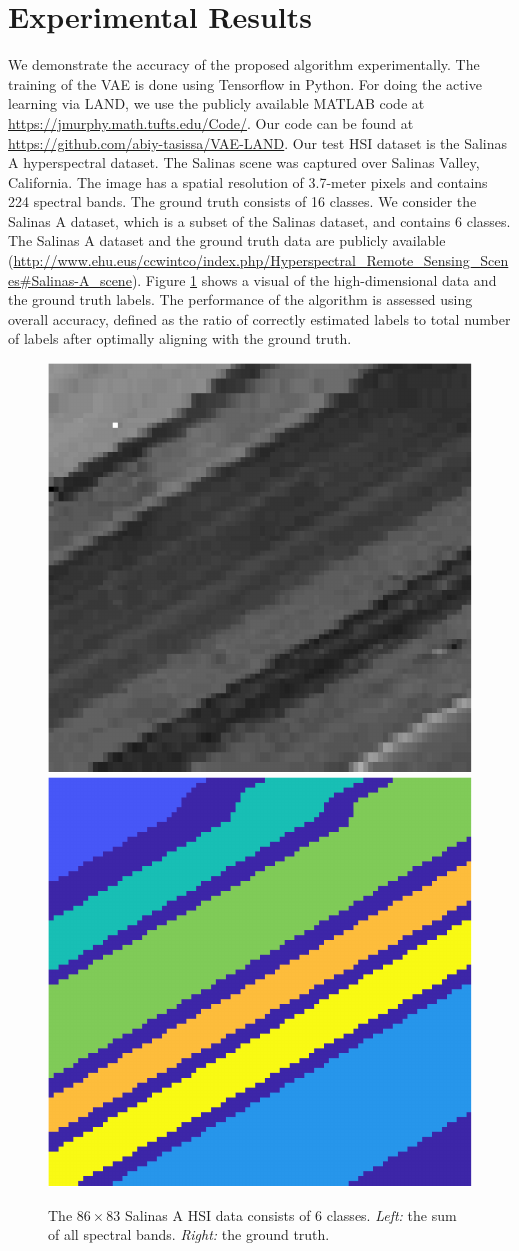 \documentclass{article}
\begin{document}
\section{Experimental Results}
\label{sec:Experiments}
We demonstrate the accuracy of the proposed algorithm experimentally.  The training of the VAE is done using Tensorflow in Python. For doing the active learning via LAND, we use the publicly available MATLAB code 
at  \url{https://jmurphy.math.tufts.edu/Code/}. Our code can be found at \url{https://github.com/abiy-tasissa/VAE-LAND}. Our test HSI dataset is the Salinas A hyperspectral dataset. The Salinas scene was captured over Salinas Valley, California. The image has a spatial resolution of 3.7-meter pixels and contains 224 spectral bands. The ground truth consists of 16 classes. We consider the Salinas A dataset, which is a subset of the Salinas dataset, and contains 6 classes. The Salinas A dataset and the ground truth data are publicly available (\url{http://www.ehu.eus/ccwintco/index.php/Hyperspectral_Remote_Sensing_Scenes#Salinas-A_scene}). Figure \ref{fig:SalinasA} shows a visual of the high-dimensional data and the ground truth labels. The performance of the algorithm is assessed using overall accuracy, defined as the ratio of correctly estimated labels to total number of labels after optimally aligning with the ground truth. 
\begin{figure}[h]
\includegraphics[width=.23\textwidth,clip]{Images/SalinasA_BandSum-crop.pdf}
\includegraphics[width=.23\textwidth,clip]{Images/SalinasA_GT-crop.pdf}
\caption{\small{The $86\times 83$ Salinas A HSI data consists of 6 classes.  \emph{Left:} the sum of all spectral bands.  \emph{Right:} the ground truth.}}
\label{fig:SalinasA}
\end{figure}
\end{document}

